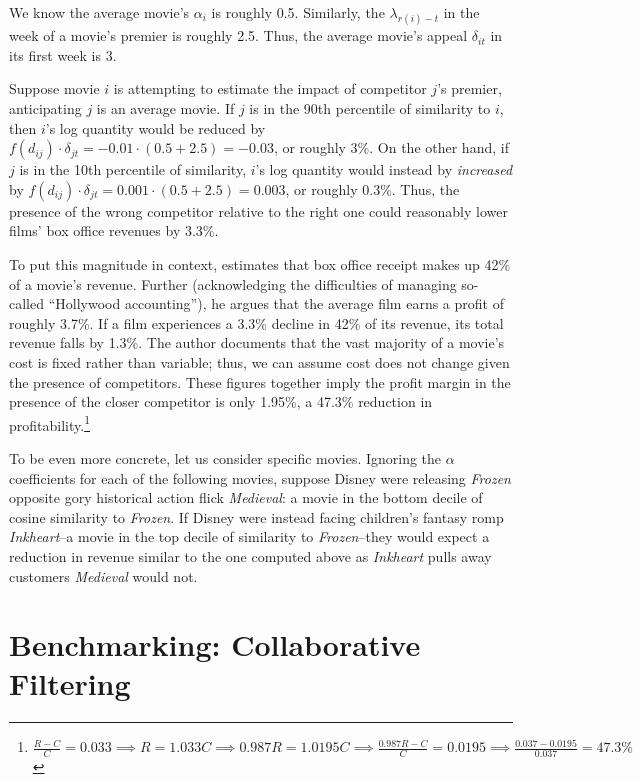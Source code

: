 \documentclass{article}
\begin{document}
We know the average movie's $\alpha_i$ is roughly 0.5. Similarly, the $\lambda_{r(i) - t}$ in the week of a movie's premier is roughly 2.5. Thus, the average movie's appeal $\delta_{it}$ in its first week is 3. 

Suppose movie $i$ is attempting to estimate the impact of competitor $j$'s premier, anticipating $j$ is an average movie. If $j$ is in the 90th percentile of similarity to $i$, then $i$'s log quantity would be reduced by $f(d_{ij}) \cdot \delta_{jt} = -0.01 \cdot (0.5 + 2.5) = -0.03$, or roughly 3\%. On the other hand, if $j$ is in the 10th percentile of similarity, $i$'s log quantity would instead by \emph{increased} by $f(d_{ij}) \cdot \delta_{jt} = 0.001 \cdot (0.5 + 2.5) = 0.003$, or roughly 0.3\%. Thus, the presence of the wrong competitor relative to the right one could reasonably lower films' box office revenues by 3.3\%.

To put this magnitude in context, \textcite{follows2016SF,follows2016SFa} estimates that box office receipt makes up 42\% of a movie's revenue. Further (acknowledging the difficulties of managing so-called ``Hollywood accounting''), he argues that the average film earns a profit of roughly 3.7\%. If a film experiences a 3.3\% decline in 42\% of its revenue, its total revenue falls by 1.3\%. The author documents that the vast majority of a movie's cost is fixed rather than variable; thus, we can assume cost does not change given the presence of competitors. These figures together imply the profit margin in the presence of the closer competitor is only 1.95\%, a 47.3\% reduction in profitability.\footnote{$\frac{R - C}{C} = 0.033 \implies R = 1.033C \implies 0.987 R = 1.0195 C \implies \frac{0.987R - C}{C} = 0.0195 \implies \frac{0.037 - 0.0195}{0.037} = 47.3\%$} 

To be even more concrete, let us consider specific movies. Ignoring the $\alpha$ coefficients for each of the following movies, suppose Disney were releasing \emph{Frozen} opposite gory historical action flick \emph{Medieval}: a movie in the bottom decile of cosine similarity to \emph{Frozen}. If Disney were instead facing children's fantasy romp \emph{Inkheart}--a movie in the top decile of similarity to \emph{Frozen}--they would expect a reduction in revenue similar to the one computed above as \emph{Inkheart} pulls away customers \emph{Medieval} would not. 


\section{Benchmarking: Collaborative Filtering}
\end{document}
